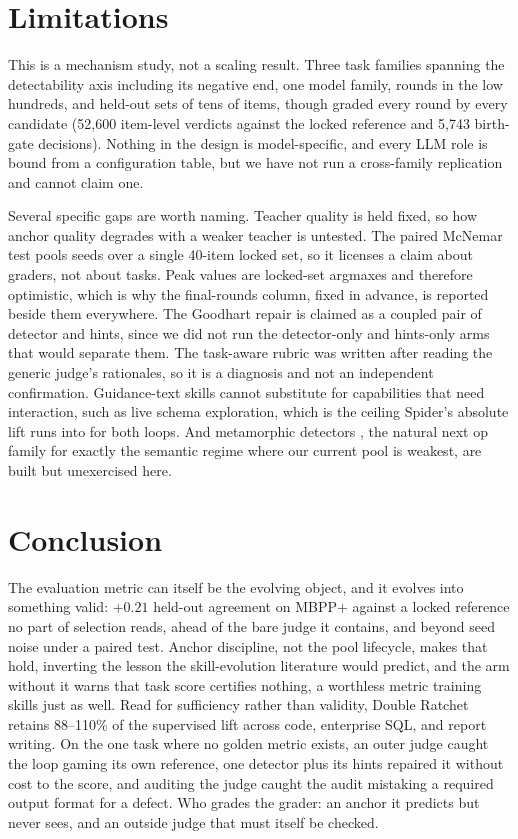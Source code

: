\documentclass[letterpaper]{article} %
\begin{document}
\section{Limitations}

This is a mechanism study, not a scaling result. Three task families spanning the detectability axis including its negative end, one model family, rounds in the low hundreds, and held-out sets of tens of items, though graded every round by every candidate (52{,}600 item-level verdicts against the locked reference and 5{,}743 birth-gate decisions). Nothing in the design is model-specific, and every LLM role is bound from a configuration table, but we have not run a cross-family replication and cannot claim one.

Several specific gaps are worth naming. Teacher quality is held fixed, so how anchor quality degrades with a weaker teacher is untested. The paired McNemar test pools seeds over a single 40-item locked set, so it licenses a claim about graders, not about tasks. Peak values are locked-set argmaxes and therefore optimistic, which is why the final-rounds column, fixed in advance, is reported beside them everywhere. The Goodhart repair is claimed as a coupled pair of detector and hints, since we did not run the detector-only and hints-only arms that would separate them. The task-aware rubric was written after reading the generic judge's rationales, so it is a diagnosis and not an independent confirmation. Guidance-text skills cannot substitute for capabilities that need interaction, such as live schema exploration, which is the ceiling Spider's absolute lift runs into for both loops. And metamorphic detectors \citep{chen1998metamorphic}, the natural next op family for exactly the semantic regime where our current pool is weakest, are built but unexercised here.

\section{Conclusion}

The evaluation metric can itself be the evolving object, and it evolves into something valid: $+0.21$ held-out agreement on MBPP+ against a locked reference no part of selection reads, ahead of the bare judge it contains, and beyond seed noise under a paired test. Anchor discipline, not the pool lifecycle, makes that hold, inverting the lesson the skill-evolution literature would predict, and the arm without it warns that task score certifies nothing, a worthless metric training skills just as well. Read for sufficiency rather than validity, Double Ratchet retains 88--110\% of the supervised lift across code, enterprise SQL, and report writing. On the one task where no golden metric exists, an outer judge caught the loop gaming its own reference, one detector plus its hints repaired it without cost to the score, and auditing the judge caught the audit mistaking a required output format for a defect. Who grades the grader: an anchor it predicts but never sees, and an outside judge that must itself be checked.
\end{document}
